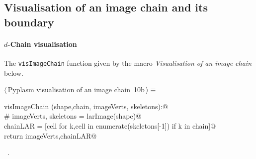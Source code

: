 \documentclass[11pt,oneside]{article}	%
\begin{document}
\subsection{Visualisation of an image chain and its boundary}


\paragraph{$d$-Chain visualisation}

The \texttt{visImageChain} function given by the macro \emph{Visualisation of an image chain} below. 

\begin{flushleft} \small
\begin{minipage}{\linewidth} \label{scrap16}
\protect{}$\langle\,$Pyplasm visualisation of an image chain\nobreak\ {\footnotesize 10b}$\,\rangle\equiv$
\vspace{-1ex}
\begin{list}{}{} \item
\mbox{}\verb@def visImageChain (shape,chain, imageVerts, skeletons):@\\
\mbox{}\verb@   # imageVerts, skeletons = larImage(shape)@\\
\mbox{}\verb@   chainLAR = [cell for k,cell in enumerate(skeletons[-1]) if k in chain]@\\
\mbox{}\verb@   return imageVerts,chainLAR@\\
\mbox{}\verb@@{\NWsep}
\end{list}
\vspace{-1ex}
\footnotesize\addtolength{\baselineskip}{-1ex}
\begin{list}{}{\setlength{\itemsep}{-\parsep}\setlength{\itemindent}{-\leftmargin}}
\item \NWtxtMacroRefIn\ .
\end{list}
\end{minipage}\\[4ex]
\end{flushleft}
\end{document}
